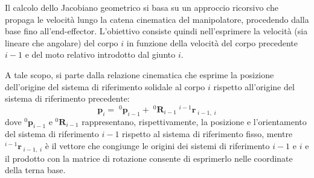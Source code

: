 \documentclass[11pt, a4paper]{report}
\begin{document}
\begin{minipage}[c]{0.48\textwidth}
\end{minipage}
\begin{minipage}[c]{0.5\textwidth}
    Il calcolo dello Jacobiano geometrico si basa su un approccio ricorsivo che propaga le velocità lungo la catena cinematica del manipolatore, procedendo dalla base fino all'end-effector. L'obiettivo consiste quindi nell'esprimere la velocità (sia lineare che angolare) del corpo \(i\) in funzione della velocità del corpo precedente \(i-1\) e del moto relativo introdotto dal giunto \(i\).
\end{minipage}

A tale scopo, si parte dalla relazione cinematica che esprime la posizione dell'origine del sistema di riferimento solidale al corpo \(i\) rispetto all'origine del sistema di riferimento precedente:
\[
    \bm{p}_i = \;^{0}\bm{p}_{i-1} + \;^{0}\bm{R}_{i-1} \;^{i-1}{\bm{r}}_{\; i-1, \; i}
\]
dove \(^{0}\bm{p}_{i-1}\) e \(^{0}\bm{R}_{i-1} \) rappresentano, rispettivamente, la posizione e l'orientamento del sistema di riferimento \(i-1\) rispetto al sistema di riferimento fisso, mentre \(^{i-1}{\bm{r}}_{\; i-1, \; i}\) è il vettore che congiunge le origini dei sistemi di riferimento \(i-1\) e \(i\) e il prodotto con la matrice di rotazione consente di esprimerlo nelle coordinate della terna base.
\end{document}
